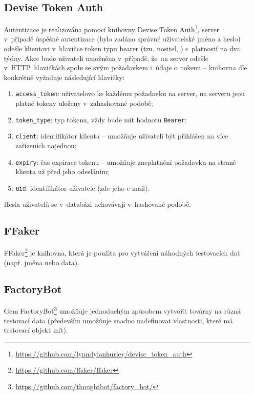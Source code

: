 \documentclass[twoside]{ctuthesis}
\begin{document}
\subsection{Devise Token Auth}
\label{sub:devise}
Autentizace je realizována pomocí knihovny Devise Token Auth\footnote{\url{https://github.com/lynndylanhurley/devise_token_auth}}, server v~případě úspěšné autentizace (bylo zadáno správné uživatelské jméno a heslo) odešle klientovi v~hlavičce token typu bearer (tzn. nositel,  \cite{swagger2020bearer}) s~platností na dva týdny. Akce bude uživateli umožněna v~případě, že~na server odešle v~HTTP~hlavičkách spolu se svým požadavkem i~údaje o~tokenu -- knihovna dle \cite{devise} konkrétně vyžaduje následující hlavičky:
\begin{enumerate}
	\item \texttt{access\_token}: uživatelovo  ke každému požadavku na server, na serveru jsou platné tokeny uloženy v~zahashované podobě;
	\item \texttt{token\_type}: typ tokenu, vždy bude mít hodnotu \texttt{Bearer};
	\item \texttt{client}: identifikátor klienta -- umožňuje uživateli být přihlášen na více zařízeních najednou;
	\item \texttt{expiry}: čas expirace tokenu -- umožňuje zneplatnění požadavku na straně klienta už před jeho odesláním;
	\item \texttt{uid}: identifikátor uživatele (zde jeho e-mail).
\end{enumerate}

Hesla uživatelů se v~databázi uchovávají v~hashované podobě.

\subsection{FFaker}

FFaker\footnote{\url{https://github.com/ffaker/ffaker}} je knihovna, která je použita pro vytváření náhodných testovacích dat (např. jména nebo data).

\subsection{FactoryBot}

Gem FactoryBot\footnote{\url{https://github.com/thoughtbot/factory_bot/}} umožňuje jednoduchým způsobem vytvořit továrny na různá testovací data (především umožňuje snadno nadefinovat vlastnosti, které má testovací objekt mít).
\end{document}
